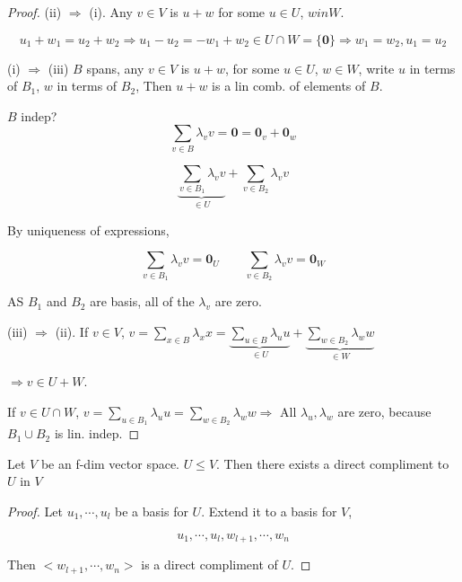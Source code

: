 \documentclass[a4paper]{article}
\begin{document}
\begin{proof}
	(ii) $ \Rightarrow $ (i). Any $ v \in V $ is $ u + w $ for some $ u \in U $, $ w in W $.
	
	\[ u_{1} + w_{1} = u_{2} + w_{2} \Rightarrow u_{1} - u_{2} = -w_{1} + w_{2} \in U \cap W = \{ \mathbf{0} \} \Rightarrow w_{1} = w_{2}, u_{1} = u_{2} \]
	
	
	(i) $ \Rightarrow $ (iii) $ B $ spans, any $ v \in V $ is $ u + w $, for some $ u \in U $, $ w \in W $, write $ u $ in terms of $ B_{1} $, $ w $ in terms of $ B_{2} $, Then $ u + w $ is a lin comb. of elements of $ B $.
	
	$ B $ indep? \[ \sum_{v \in B} \lambda_{v} v = \mathbf{0} = \mathbf{0}_{v} + \mathbf{0}_{w} \]
	
	\[ \underbrace{\sum_{v \in B_{1}} \lambda_{v} v}_{\in U} + \sum_{v \in B_{2}} \lambda_{v} v \]
	
	
	By uniqueness of expressions, 
	
	\[ \sum_{v \in B_{1}} \lambda_{v} v = \mathbf{0}_{U} \qquad \sum_{v \in B_{2}} \lambda_{v} v = \mathbf{0}_{W} \]
	
	AS $ B_{1} $ and $ B_{2} $ are basis, all of the $ \lambda_{v} $ are zero. 
	
	
	(iii) $ \Rightarrow $ (ii). If $ v \in V $, $ v = \sum_{x \in B}  \lambda_{x} x = \underbrace{\sum_{u \in B} \lambda_{u} u }_{\in U} + \underbrace{\sum_{w \in B_{2}}   \lambda_{w} w }_{\in W}  $
	
	$ \Rightarrow v \in U + W $.
	
	
	If $ v \in U \cap W $, $ v = \sum_{u \in B_{1}}  \lambda_{u} u = \sum_{w \in B_{2}}  \lambda_{w} w  \Rightarrow $ All $ \lambda_{u},\lambda_{w} $ are zero, because $ B_{1} \cup B_{2}  $ is lin. indep.
	
\end{proof}
	
	\begin{lemma} 
		Let $ V $ be an f-dim vector space. $ U \leq V $.
		Then there exists a direct compliment to $ U $ in $ V $
		
	\end{lemma}

\begin{proof}
	Let $ u_{1},\cdots,u_{l} $ be a basis for $ U $. Extend it to a basis for $ V $, 
	
	\[ u_{1},\cdots,u_{l},w_{l+1},\cdots,w_{n} \]
	
	Then $ <w_{l+1},\cdots,w_{n}>$ is a direct compliment of $ U $. 
\end{proof}
\end{document}
